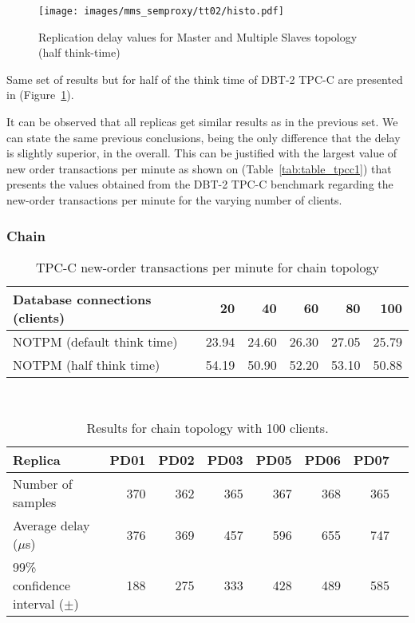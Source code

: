\begin{figure}[t]
\centering    
\texttt{[image: images/mms\_semproxy/tt02/histo.pdf]}
\caption{Replication delay values for Master and Multiple Slaves topology (half think-time)}
\label{fig:mms_tt02}
\end{figure}

Same set of results but for half of the think time of DBT-2 TPC-C are presented in (Figure~\ref{fig:mms_tt02}).

It can be observed that all replicas get similar results as in the previous set. We can state the same previous conclusions, being the only difference that the delay is slightly superior, in the overall. This can be justified with the largest value of new order transactions per minute as shown on (Table~\ref{tab:table_tpcc1}) that presents the values obtained from the DBT-2 TPC-C benchmark regarding the new-order transactions per minute for the varying number of clients.

\clearpage

\subsubsection{Chain}

\begin{table}[t]
\centering    
\begin{tabular}{lrrrrr}
 \hline\hline
Database connections (clients) & 20 & 40 & 60 & 80 & 100 \\
\hline
NOTPM (default think time) & 23.94 & 24.60 & 26.30 & 27.05 & 25.79 \\
NOTPM (half think time) & 54.19 & 50.90 & 52.20 & 53.10 & 50.88 \\
\hline
\end{tabular}

~\\
\caption{TPC-C new-order transactions per minute for chain topology}
\label{tab:table_tpcc2}
\end{table}

\begin{table}[t]
\centering    
\begin{tabular}{lrrrrrrr}
 \hline\hline
 Replica & PD01 & PD02 & PD03 & PD05 & PD06 & PD07 \\
\hline
Number of samples & 370 & 362 & 365 & 367 & 368 & 365 \\
Average delay ($\mu$s) & 376 & 369 & 457 & 596 & 655 & 747 \\
99\% confidence interval ($\pm$) & 188 & 275 & 333 & 428 & 489 & 585 \\
\hline
\end{tabular}

~\\
\caption{Results for chain topology with 100 clients.}
\label{tab:table2}
\end{table}


